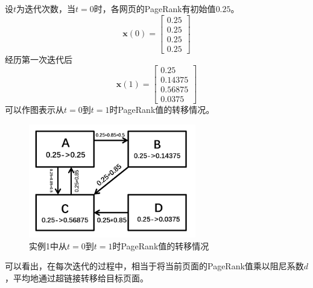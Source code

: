 \documentclass[UTF8,openany]{ctexbook}
\begin{document}
设$t$为迭代次数，当$t=0$时，各网页的PageRank有初始值$0.25$。
$$
    \boldsymbol{x}(0)=\begin{bmatrix}
        0.25 \\0.25\\0.25\\0.25
    \end{bmatrix}
$$
经历第一次迭代后
$$
    \boldsymbol{x}(1)=\begin{bmatrix}
        0.25 \\0.14375\\0.56875\\0.0375
    \end{bmatrix}
$$
可以作图表示从$t=0$到$t=1$时PageRank值的转移情况。
\begin{figure}[H]
    \begin{center}
        \includegraphics[width=0.65\textwidth]{images/pic1-0-1.png}
        \caption{实例1中从$t=0$到$t=1$时PageRank值的转移情况}
    \end{center}
\end{figure}
可以看出，在每次迭代的过程中，相当于将当前页面的PageRank值乘以阻尼系数$d$，平均地通过超链接转移给目标页面\cite{bi:WX}。
\end{document}
